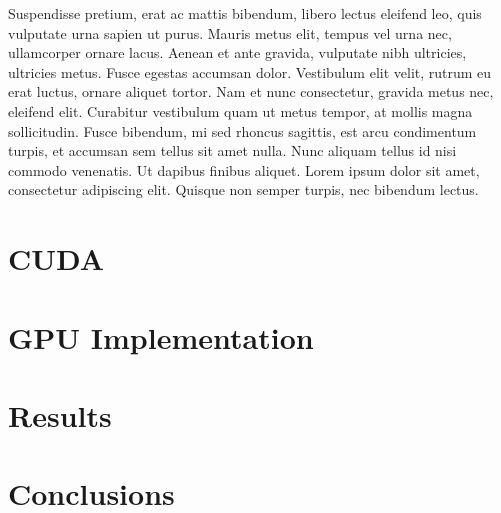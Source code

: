 \documentclass[a4paper,11pt]{kth-mag}
\begin{document}
Suspendisse pretium, erat ac mattis bibendum, libero lectus eleifend leo, quis vulputate urna sapien ut purus. Mauris metus elit, tempus vel urna nec, ullamcorper ornare lacus. Aenean et ante gravida, vulputate nibh ultricies, ultricies metus. Fusce egestas accumsan dolor. Vestibulum elit velit, rutrum eu erat luctus, ornare aliquet tortor. Nam et nunc consectetur, gravida metus nec, eleifend elit. Curabitur vestibulum quam ut metus tempor, at mollis magna sollicitudin. Fusce bibendum, mi sed rhoncus sagittis, est arcu condimentum turpis, et accumsan sem tellus sit amet nulla. Nunc aliquam tellus id nisi commodo venenatis. Ut dapibus finibus aliquet. Lorem ipsum dolor sit amet, consectetur adipiscing elit. Quisque non semper turpis, nec bibendum lectus.

\chapter{CUDA}
\chapter{GPU Implementation}
\chapter{Results}



\chapter{Conclusions}

\appendix
\addappheadtotoc
\end{document}
